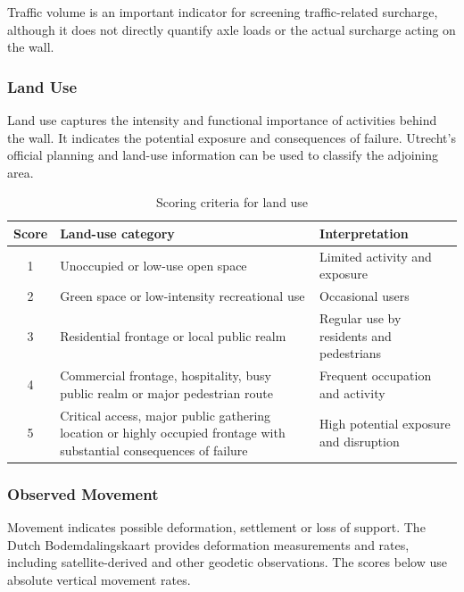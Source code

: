 Traffic volume is an important indicator for screening traffic-related surcharge, although it does not directly quantify axle loads or the actual surcharge acting on the wall.

\subsubsection{Land Use}

Land use captures the intensity and functional importance of activities behind the wall. It indicates the potential exposure and consequences of failure. Utrecht's official planning and land-use information can be used to classify the adjoining area.

\begin{table}[htbp]
    \centering
    \caption{Scoring criteria for land use}
    \vspace{2mm}
    \begin{tabularx}{\textwidth}{c X X}
        \toprule
        \textbf{Score} & \textbf{Land-use category} & \textbf{Interpretation} \\
        \midrule
        1 & Unoccupied or low-use open space & Limited activity and exposure \\
        2 & Green space or low-intensity recreational use & Occasional users \\
        3 & Residential frontage or local public realm & Regular use by residents and pedestrians \\
        4 & Commercial frontage, hospitality, busy public realm or major pedestrian route & Frequent occupation and activity \\
        5 & Critical access, major public gathering location or highly occupied frontage with substantial consequences of failure & High potential exposure and disruption \\
        \bottomrule
    \end{tabularx}
\end{table}

\subsubsection{Observed Movement}

Movement indicates possible deformation, settlement or loss of support. The Dutch Bodemdalingskaart provides deformation measurements and rates, including satellite-derived and other geodetic observations. The scores below use absolute vertical movement rates.

